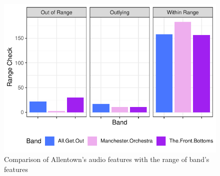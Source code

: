 \documentclass{article}\usepackage[]{graphicx}\usepackage[]{xcolor}
\makeatletter
\def\maxwidth{ %
  \ifdim\Gin@nat@width>\linewidth
    \linewidth
  \else
    \Gin@nat@width
  \fi
}
\newenvironment{knitrout}{}{} %
\makeatother
\begin{document}
\begin{figure}[H] \begin{center}
\begin{knitrout}
\color{fgcolor}
\includegraphics[width=\maxwidth]{figure/unnamed-chunk-6-1} 
\end{knitrout}
\caption{Comparison of Allentown's audio features with the range of band's features} \label{plot.allen}
\end{center}
\end{figure}
\end{document}
